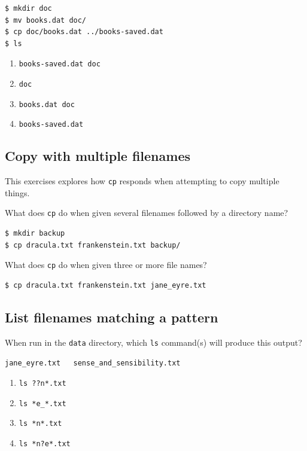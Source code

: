 \documentclass[
]{krantz}
\providecommand{\tightlist}{%
  \setlength{\itemsep}{0pt}\setlength{\parskip}{0pt}}
\begin{document}
\begin{verbatim}
$ mkdir doc
$ mv books.dat doc/
$ cp doc/books.dat ../books-saved.dat
$ ls
\end{verbatim}

\begin{enumerate}
\def\labelenumi{\arabic{enumi}.}
\tightlist
\item
  \texttt{books-saved.dat\ doc}
\item
  \texttt{doc}
\item
  \texttt{books.dat\ doc}
\item
  \texttt{books-saved.dat}
\end{enumerate}

\hypertarget{bash-basics-ex-copy-multi}{%
\subsection{Copy with multiple filenames}\label{bash-basics-ex-copy-multi}}

This exercises explores how \texttt{cp} responds when attempting to copy multiple things.

What does \texttt{cp} do when given several filenames followed by a directory name?

\begin{verbatim}
$ mkdir backup
$ cp dracula.txt frankenstein.txt backup/
\end{verbatim}

What does \texttt{cp} do when given three or more file names?

\begin{verbatim}
$ cp dracula.txt frankenstein.txt jane_eyre.txt
\end{verbatim}

\hypertarget{bash-basics-ex-ls-match}{%
\subsection{List filenames matching a pattern}\label{bash-basics-ex-ls-match}}

When run in the \texttt{data} directory, which \texttt{ls} command(s) will
produce this output?

\texttt{jane\_eyre.txt\ \ \ sense\_and\_sensibility.txt}

\begin{enumerate}
\def\labelenumi{\arabic{enumi}.}
\tightlist
\item
  \texttt{ls\ ??n*.txt}
\item
  \texttt{ls\ *e\_*.txt}
\item
  \texttt{ls\ *n*.txt}
\item
  \texttt{ls\ *n?e*.txt}
\end{enumerate}
\end{document}

